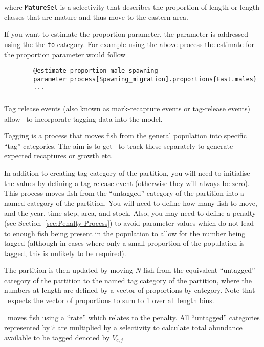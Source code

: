 where \texttt{MatureSel} is a selectivity that describes the proportion of length or length classes that are mature and thus move to the eastern area.

If you want to estimate the proportion parameter, the parameter is addressed using the the \texttt{to} category. For example using the above process the estimate for the proportion parameter would follow

{\small{\begin{verbatim}
		@estimate proportion_male_spawning
		parameter process[Spawning_migration].proportions{East.males}
		...
		\end{verbatim}}}

\subsubsection{}\label{sec:Process-Tagging}

Tag release events (also known as mark-recapture events or tag-release events) allow \CNAME\ to incorporate tagging data into the model.

Tagging is a process that moves fish from the general population into specific \enquote{tag} categories. The aim is to get \CNAME\ to track these separately to generate expected recaptures or growth etc.

In addition to creating tag category of the partition, you will need to initialise the values by defining a tag-release event (otherwise they will always be zero). This process moves fish from the \enquote{untagged} category of the partition into a named category of the partition. You will need to define how many fish to move, and the year, time step, area, and stock. Also, you may need to define a penalty (see Section~\ref{sec:Penalty-Process}) to avoid parameter values which do not lead to enough fish being present in the population to allow for the number being tagged (although in cases where only a small proportion of the population is tagged, this is unlikely to be required).

The partition is then updated by moving \(N\) fish from the equivalent \enquote{untagged} category of the partition to the named tag category of the partition, where the numbers at length are defined by a vector of proportions by category. Note that \CNAME\ expects the vector of proportions to sum to 1 over all length bins.

\CNAME\ moves fish using a \enquote{rate} which relates to the penalty. All \enquote{untagged} categories represented by \(\tilde{c}\) are multiplied by a selectivity to calculate total abundance available to be tagged denoted by \(V_{c,j}\)

